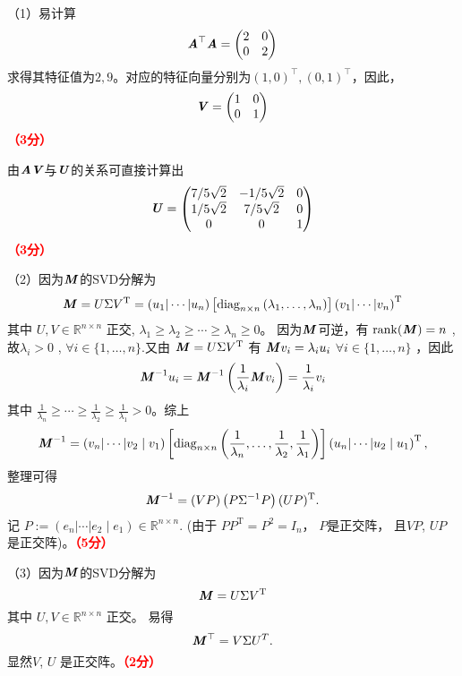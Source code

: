 \documentclass[12pt,a4paper,openany,twoside]{ctexbook}
\begin{document}
\begin{Solution}
	（1）易计算
			$$\boldsymbol{\mathit{A}}^\top \boldsymbol{\mathit{A}} =\begin{pmatrix}
				2& 0\\
				0& 2\end{pmatrix}$$
		求得其特征值为$2,9$。对应的特征向量分别为$(1, 0)^\top, (0, 1)^\top$，因此，
		$$\boldsymbol{\mathit{V}} =\begin{pmatrix}
			1& 0\\
			0& 1\end{pmatrix}$$\hfill \textcolor{red}{\textbf{（3分）}}
		
		由$\boldsymbol{\mathit{A}} \boldsymbol{\mathit{V}}$与$\boldsymbol{\mathit{U}}$的关系可直接计算出
		$$\boldsymbol{\mathit{U}} =\begin{pmatrix}
			7/5\sqrt{2}& -1/5\sqrt{2}& 0\\
			1/5\sqrt{2}& 7/5\sqrt{2} & 0\\
			0& 0 & 1
	\end{pmatrix}$$\hfill \textcolor{red}{\textbf{（3分）}}

	（2）因为$\boldsymbol{\mathit{M}}$的SVD分解为
	$$
	\boldsymbol{\mathit{M}}=U \Sigma V^{\mathrm{T}}=\left(u_1|\cdots| u_n\right)\left[\operatorname{diag}_{n \times n}\left(\lambda_1, \ldots, \lambda_n\right)\right]\left(v_1|\cdots| v_n\right)^{\mathrm{T}}
	$$
	其中 $U, V \in \mathbb{R}^{n \times n}$ 正交, $\lambda_1 \geq \lambda_2 \geq \cdots \geq \lambda_n \geq 0$。 因为$\boldsymbol{\mathit{M}}$可逆，有 $\operatorname{rank}(\boldsymbol{\mathit{M}})=n$ , 故$\lambda_i>0$ , $\forall i \in\{1, \ldots, n\}$.又由 $\boldsymbol{\mathit{M}}=U \Sigma V^{\mathrm{T}}$ 有 $\boldsymbol{\mathit{M}} v_i=\lambda_i u_i$ $\forall i \in\{1, \ldots, n\}$ ，因此 
	$$\boldsymbol{\mathit{M}}^{-1} u_i=\boldsymbol{\mathit{M}}^{-1}\left(\frac{1}{\lambda_i} \boldsymbol{\mathit{M}} v_i\right)=\frac{1}{\lambda_i} v_i$$
	其中 $\frac{1}{\lambda_n} \geq \cdots \geq \frac{1}{\lambda_2} \geq \frac{1}{\lambda_1}>0$。综上
	$$
	\boldsymbol{\mathit{M}}^{-1}=\left(v_n|\cdots| v_2 \mid v_1\right)\left[\operatorname{diag}_{n \times n}\left(\frac{1}{\lambda_n}, \ldots, \frac{1}{\lambda_2}, \frac{1}{\lambda_1}\right)\right]\left(u_n|\cdots| u_2 \mid u_1\right)^{\mathrm{T}},
	$$
	整理可得
	$$
	\boldsymbol{\mathit{M}}^{-1}=(V P)\left(P \Sigma^{-1} P\right)(U P)^{\mathrm{T}}.
	$$
	记 $P:=\left(e_n|\cdots| e_2 \mid e_1\right) \in \mathbb{R}^{n \times n}$. (由于 $P P^{\mathrm{T}}=P^2=I_n$， $P$是正交阵， 且$V P$, $U P$ 是正交阵)。\hfill \textcolor{red}{\textbf{（5分）}}
	
	（3）因为$\boldsymbol{\mathit{M}}$的SVD分解为
	$$
	\boldsymbol{\mathit{M}}=U \Sigma V^{\mathrm{T}}
	$$
	其中 $U, V \in \mathbb{R}^{n \times n}$ 正交。 
	易得
	$$
	\boldsymbol{\mathit{M}}^\top=V \Sigma U^T.
	$$
	显然$V$, $U$ 是正交阵。\hfill \textcolor{red}{\textbf{（2分）}}
\end{Solution}
\end{document}

